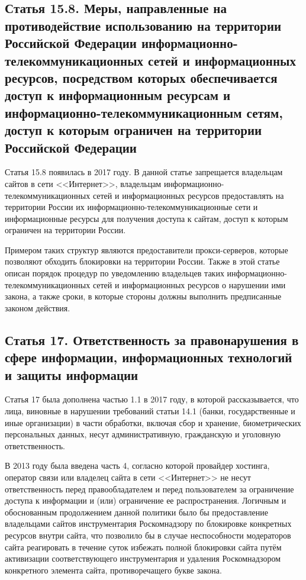 \subsection{Статья 15.8. Меры, направленные на противодействие использованию на территории Российской Федерации информационно-телекоммуникационных сетей и информационных ресурсов, посредством которых обеспечивается доступ к информационным ресурсам и информационно-телекоммуникационным сетям, доступ к которым ограничен на территории Российской Федерации}

Статья 15.8 появилась в 2017 году. В данной статье запрещается владельцам сайтов в сети <<Интернет>>, владельцам информационно-телекоммуникационных сетей и информационных ресурсов предоставлять на территории России их информационно-телекоммуникационные сети и информационные ресурсы для получения доступа к сайтам, доступ к которым ограничен на территории России. 


Примером таких структур являются предоставители прокси-серверов, которые позволяют обходить блокировки на территории России. Также в этой статье описан порядок процедур по уведомлению владельцев таких информационно-телекоммуникационных сетей и информационных ресурсов о нарушении ими закона, а также сроки, в которые стороны должны выполнить предписанные законом действия.

\subsection{Статья 17. Ответственность за правонарушения в сфере информации, информационных технологий и защиты информации}

Статья 17 была дополнена частью 1.1 в 2017 году, в которой рассказывается, что лица, виновные в нарушении требований статьи 14.1 (банки, государственные и иные организации) в части обработки, включая сбор и хранение, биометрических персональных данных, несут административную, гражданскую и уголовную ответственность. 


В 2013 году была введена часть 4, согласно которой провайдер хостинга, оператор связи или владелец сайта в сети <<Интернет>> не несут ответственность перед правообладателем и перед пользователем за ограничение доступа к информации и (или) ограничение ее распространения. Логичным и обоснованным продолжением данной политики было бы предоставление владельцами сайтов инструментария Роскомнадзору по блокировке конкретных ресурсов внутри сайта, что позволило бы в случае неспособности модераторов сайта реагировать в 
течение суток избежать полной блокировки сайта путём активизации соответствующего инструментария и удаления Роскомнадзором конкретного элемента сайта, противоречащего букве закона.

